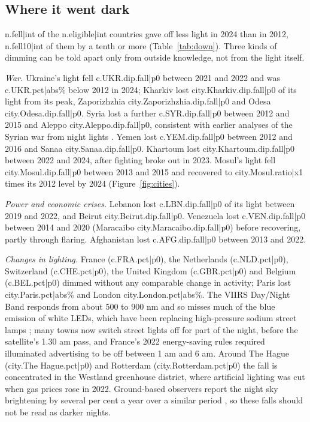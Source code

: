 \documentclass[11pt,a4paper]{article}
\begin{document}
\subsection{Where it went dark}
{{n.fell|int}} of the {{n.eligible|int}} countries gave off less light in 2024 than in 2012, {{n.fell10|int}} of them by a tenth or more (Table~\ref{tab:down}). Three kinds of dimming can be told apart only from outside knowledge, not from the light itself.

\emph{War.} Ukraine's light fell {{c.UKR.dip.fall|p0}} between 2021 and 2022 and was {{c.UKR.pct|abs}}\% below 2012 in 2024; Kharkiv lost {{city.Kharkiv.dip.fall|p0}} of its light from its peak, Zaporizhzhia {{city.Zaporizhzhia.dip.fall|p0}} and Odesa {{city.Odesa.dip.fall|p0}}. Syria lost a further {{c.SYR.dip.fall|p0}} between 2012 and 2015 and Aleppo {{city.Aleppo.dip.fall|p0}}, consistent with earlier analyses of the Syrian war from night lights \citep{li2014}. Yemen lost {{c.YEM.dip.fall|p0}} between 2012 and 2016 and Sanaa {{city.Sanaa.dip.fall|p0}}. Khartoum lost {{city.Khartoum.dip.fall|p0}} between 2022 and 2024, after fighting broke out in 2023. Mosul's light fell {{city.Mosul.dip.fall|p0}} between 2013 and 2015 and recovered to {{city.Mosul.ratio|x1}} times its 2012 level by 2024 (Figure~\ref{fig:cities}).

\emph{Power and economic crises.} Lebanon lost {{c.LBN.dip.fall|p0}} of its light between 2019 and 2022, and Beirut {{city.Beirut.dip.fall|p0}}. Venezuela lost {{c.VEN.dip.fall|p0}} between 2014 and 2020 (Maracaibo {{city.Maracaibo.dip.fall|p0}}) before recovering, partly through flaring. Afghanistan lost {{c.AFG.dip.fall|p0}} between 2013 and 2022.

\emph{Changes in lighting.} France ({{c.FRA.pct|p0}}), the Netherlands ({{c.NLD.pct|p0}}), Switzerland ({{c.CHE.pct|p0}}), the United Kingdom ({{c.GBR.pct|p0}}) and Belgium ({{c.BEL.pct|p0}}) dimmed without any comparable change in activity; Paris lost {{city.Paris.pct|abs}}\% and London {{city.London.pct|abs}}\%. The VIIRS Day/Night Band responds from about 500 to 900 nm and so misses much of the blue emission of white LEDs, which have been replacing high-pressure sodium street lamps \citep{kyba2017}; many towns now switch street lights off for part of the night, before the satellite's 1.30 am pass, and France's 2022 energy-saving rules required illuminated advertising to be off between 1 am and 6 am. Around The Hague ({{city.The Hague.pct|p0}}) and Rotterdam ({{city.Rotterdam.pct|p0}}) the fall is concentrated in the Westland greenhouse district, where artificial lighting was cut when gas prices rose in 2022. Ground-based observers report the night sky brightening by several per cent a year over a similar period \citep{kyba2023}, so these falls should not be read as darker nights.
\end{document}
